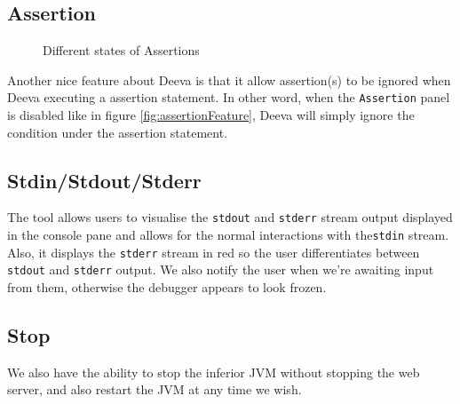\documentclass[11pt, a4paper]{article}
\newcommand{\cmd}[1]{{\tt #1}}
\begin{document}
\subsection{Assertion}
\begin{figure}[h!]
\centering
{}
\quad
{}
\caption{Different states of Assertions}
\end{figure}
Another nice feature about Deeva is that it allow assertion(s) to be ignored when Deeva executing a assertion statement.
In other word, when the {\tt Assertion} panel is disabled like in figure \ref{fig:assertionFeature}, Deeva will simply ignore the condition under the assertion statement.

\subsection{Stdin/Stdout/Stderr}
The tool allows users to visualise the \cmd{stdout} and \cmd{stderr} stream output displayed in the console pane and allows for the normal interactions with the\cmd{stdin} stream. Also, it displays the \cmd{stderr} stream in red so the user differentiates between \cmd{stdout} and \cmd{stderr} output.
We also notify the user when we're awaiting input from them, otherwise the debugger appears to look frozen.

\subsection{Stop}
We also have the ability to stop the inferior JVM without stopping the web server, and also restart the JVM at any time we wish.
\end{document}
